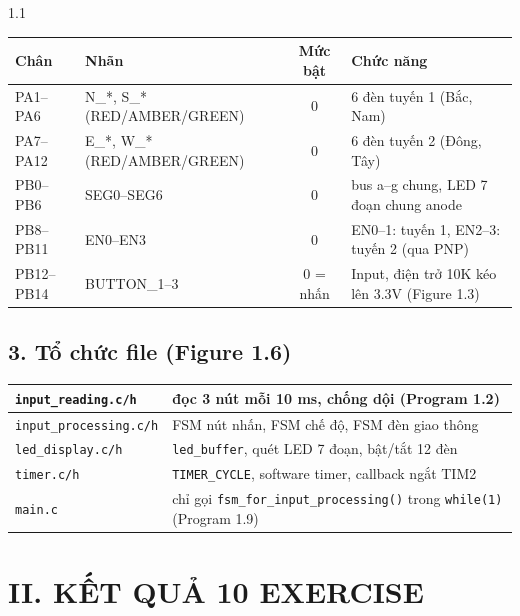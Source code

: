\documentclass[a4paper,12pt]{article}
\begin{document}
\begin{spacing}{1.1}
\begin{center}
\small
\begin{tabularx}{\textwidth}{|l|l|c|X|}
\hline
\textbf{Chân} & \textbf{Nhãn} & \textbf{Mức bật} & \textbf{Chức năng} \\\hline
PA1--PA6   & N\_*, S\_* (RED/AMBER/GREEN) & 0 & 6 đèn tuyến 1 (Bắc, Nam) \\\hline
PA7--PA12  & E\_*, W\_* (RED/AMBER/GREEN) & 0 & 6 đèn tuyến 2 (Đông, Tây) \\\hline
PB0--PB6   & SEG0--SEG6 & 0 & bus a--g chung, LED 7 đoạn chung anode \\\hline
PB8--PB11  & EN0--EN3   & 0 & EN0--1: tuyến 1, EN2--3: tuyến 2 (qua PNP) \\\hline
PB12--PB14 & BUTTON\_1--3 & 0 = nhấn & Input, điện trở 10K kéo lên 3.3V (Figure 1.3) \\\hline
\end{tabularx}
\end{center}

\subsection*{3. Tổ chức file (Figure 1.6)}

\begin{center}
\small
\begin{tabularx}{\textwidth}{|l|X|}
\hline
\texttt{input\_reading.c/h}    & đọc 3 nút mỗi 10 ms, chống dội (Program 1.2) \\\hline
\texttt{input\_processing.c/h} & FSM nút nhấn, FSM chế độ, FSM đèn giao thông \\\hline
\texttt{led\_display.c/h}      & \texttt{led\_buffer}, quét LED 7 đoạn, bật/tắt 12 đèn \\\hline
\texttt{timer.c/h}             & \texttt{TIMER\_CYCLE}, software timer, callback ngắt TIM2 \\\hline
\texttt{main.c}                & chỉ gọi \texttt{fsm\_for\_input\_processing()} trong \texttt{while(1)} (Program 1.9) \\\hline
\end{tabularx}
\end{center}

\clearpage
\section*{\centering II. KẾT QUẢ 10 EXERCISE}


\end{spacing}
\end{document}
